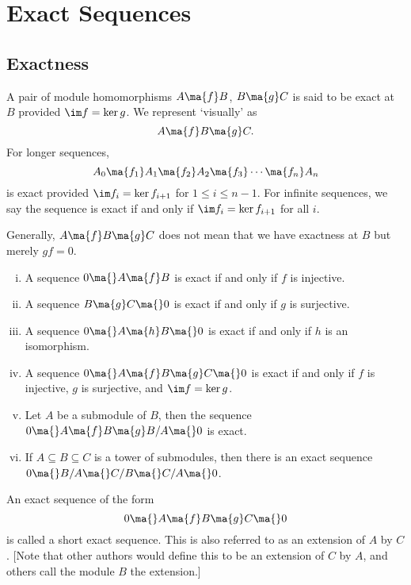 \section{Exact Sequences}
\subsection{Exactness}


\begin{dfn}[Exactness]
A pair of module homomorphisms $A\ma{f} B$, $B \ma{g} C$ is said to be exact at $B$ provided $\im f = \ker g$. We represent `visually' as
	\[
	A \ma{f} B \ma{g} C.
	\]
For longer sequences, 
	\[
	A_0 \ma{f_1} A_1 \ma{f_2} A_2 \ma{f_3} \cdots \ma{f_n} A_n
	\]
is exact provided $\im f_i=\ker f_{i+1}$ for $1 \leq i \leq n-1$. For infinite sequences, we say the sequence is exact if and only if $\im f_i=\ker f_{i+1}$ for all $i$. 
\end{dfn}


\begin{rem}
Generally, $A \ma{f} B \ma{g} C$ does not mean that we have exactness at $B$ but merely $gf=0$.
\end{rem}


\begin{ex} \hfill
\begin{enumerate}[(i)]
\item A sequence $0 \ma{} A \ma{f} B$ is exact if and only if $f$ is injective.
\item A sequence $B \ma{g} C \ma{} 0$ is exact if and only if $g$ is surjective.
\item A sequence $0 \ma{} A \ma{h} B \ma{} 0$ is exact if and only if $h$ is an isomorphism.
\item A sequence $0 \ma{} A \ma{f} B \ma{g} C \ma{} 0$ is exact if and only if $f$ is injective, $g$ is surjective, and $\im f=\ker g$. 
\item Let $A$ be a submodule of $B$, then the sequence $0 \ma{} A \ma{f} B \ma{g} B/A \ma{} 0$ is exact. 
\item If $A \subseteq B \subseteq C$ is a tower of submodules, then there is an exact sequence $0 \ma{} B/A \ma{} C/B \ma{} C/A \ma{} 0$. 
\end{enumerate} \xqed
\end{ex}


\begin{dfn}
An exact sequence of the form 
	\[
	0 \ma{} A \ma{f} B \ma{g} C \ma{} 0
	\]
is called a short exact sequence. This is also referred to as an extension of $A$ by $C$. [Note that other authors would define this to be an extension of $C$ by $A$, and others call the module $B$ the extension.] 
\end{dfn}


